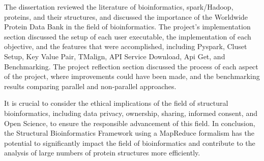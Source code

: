 \documentclass[]{final_report}
\begin{document}
The dissertation reviewed the literature of bioinformatics, spark/Hadoop, proteins, and their structures, and discussed the importance of the Worldwide Protein Data Bank in the field of bioinformatics. The project's implementation section discussed the setup of each user executable, the implementation of each objective, and the features that were accomplished, including Pyspark, Cluset Setup, Key Value Pair, TMalign, API Service Download, Api Get, and Benchmarking. The project reflection section discussed the process of each aspect of the project, where improvements could have been made, and the benchmarking results comparing parallel and non-parallel approaches.

It is crucial to consider the ethical implications of the field of structural bioinformatics, including data privacy, ownership, sharing, informed consent, and Open Science, to ensure the responsible advancement of this field. In conclusion, the Structural Bioinformatics Framework using a MapReduce formalism has the potential to significantly impact the field of bioinformatics and contribute to the analysis of large numbers of protein structures more efficiently.



\end{document}
